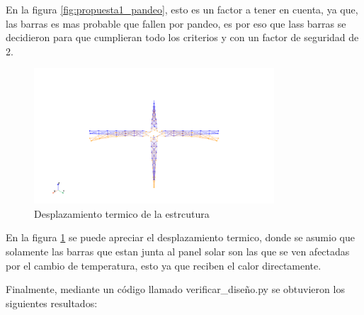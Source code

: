 En la figura \ref{fig:propuesta1_pandeo}, esto es un factor a tener en cuenta, ya que, las barras es mas probable que fallen por pandeo, es por eso que lass barras se decidieron para que cumplieran todo los criterios y con un factor de seguridad de 2.

\begin{figure}[H]
    \centering
    \includegraphics[width=0.8\textwidth]{GRAFICOS_DISENO_LUKAS/desplazamiento_termico.png}
    \caption{Desplazamiento termico de la estrcutura}
    \label{fig:propuesta1_termico}
\end{figure}

En la figura \ref{fig:propuesta1_termico} se puede apreciar el desplazamiento termico, donde se asumio que solamente las barras que estan junta al panel solar son las que se ven afectadas por el cambio de temperatura, esto ya que reciben el calor directamente.

Finalmente, mediante un código llamado verificar\_diseño.py se obtuvieron los siguientes resultados:

